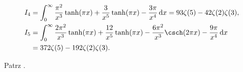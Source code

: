 %

\begin{problem_with_solution}
    \label{valean_1_40}%
    \begin{align}
        I_4 & = \int_0^\infty \frac{\pi^2}{x^3} \tanh (\pi x)  + \frac{3}{x^5} \tanh(\pi x) - \frac{3\pi}{x^4} \,\mathrm{d}x = 93 \zeta(5) - 42 \zeta(2) \zeta(3), \\
        I_5 & = \int_0^\infty \frac{2\pi^2}{x^3} \tanh(\pi x) + \frac{12}{x^5} \tanh (\pi x) - \frac{6 \pi^2}{x^3} \csch (2 \pi x) - \frac{9 \pi}{x^4} \,\mathrm{d} x \\
        & = 372 \zeta(5) - 192 \zeta(2)\zeta(3).
    \end{align} 
\end{problem_with_solution}

\begin{solution}
    Patrz \cite[s. ?????]{valean19}.
\end{solution}

%